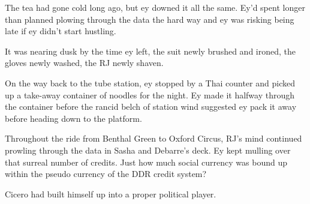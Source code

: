 The tea had gone cold long ago, but ey downed it all the same. Ey'd spent longer than planned plowing through the data the hard way and ey was risking being late if ey didn't start hustling.

It was nearing dusk by the time ey left, the suit newly brushed and ironed, the gloves newly washed, the RJ newly shaven.

On the way back to the tube station, ey stopped by a Thai counter and picked up a take-away container of noodles for the night. Ey made it halfway through the container before the rancid belch of station wind suggested ey pack it away before heading down to the platform.

Throughout the ride from Benthal Green to Oxford Circus, RJ's mind continued prowling through the data in Sasha and Debarre's deck. Ey kept mulling over that surreal number of credits. Just how much social currency was bound up within the pseudo currency of the DDR credit system?

Cicero had built himself up into a proper political player.
